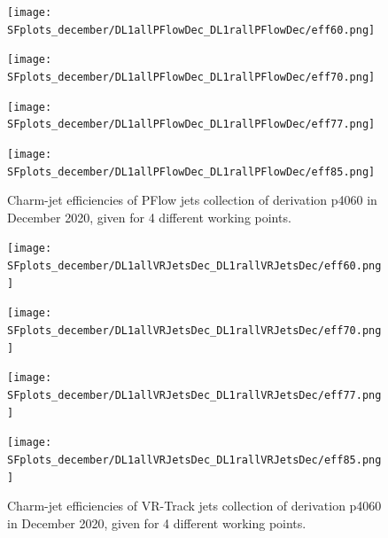 \documentclass[letterpaper,12pt]{article}
\begin{document}
\begin{figure}[H]
\begin{minipage}[b]{.45\textwidth}
\centering
\texttt{[image: SFplots\_december/DL1allPFlowDec\_DL1rallPFlowDec/eff60.png]}
\end{minipage}\hfill
\begin{minipage}[b]{.45\textwidth}
\centering
\texttt{[image: SFplots\_december/DL1allPFlowDec\_DL1rallPFlowDec/eff70.png]}
\end{minipage}\hfill
\begin{minipage}[b]{.45\textwidth}
\centering
\texttt{[image: SFplots\_december/DL1allPFlowDec\_DL1rallPFlowDec/eff77.png]}
\end{minipage}\hfill
\begin{minipage}[b]{.45\textwidth}
\centering
\texttt{[image: SFplots\_december/DL1allPFlowDec\_DL1rallPFlowDec/eff85.png]}
\end{minipage}
\caption{Charm-jet efficiencies of PFlow jets collection of derivation 
p4060 in December 2020, given for 4 different working points.} \label{fig:Dec_eff_PFlow}
\end{figure}

\begin{figure}[H]
\begin{minipage}[b]{.45\textwidth}
\centering
\texttt{[image: SFplots\_december/DL1allVRJetsDec\_DL1rallVRJetsDec/eff60.png]}
\end{minipage}\hfill
\begin{minipage}[b]{.45\textwidth}
\centering
\texttt{[image: SFplots\_december/DL1allVRJetsDec\_DL1rallVRJetsDec/eff70.png]}
\end{minipage}\hfill
\begin{minipage}[b]{.45\textwidth}
\centering
\texttt{[image: SFplots\_december/DL1allVRJetsDec\_DL1rallVRJetsDec/eff77.png]}
\end{minipage}\hfill
\begin{minipage}[b]{.45\textwidth}
\centering
\texttt{[image: SFplots\_december/DL1allVRJetsDec\_DL1rallVRJetsDec/eff85.png]}
\end{minipage}
\caption{Charm-jet efficiencies of VR-Track jets collection of derivation 
p4060 in December 2020, given for 4 different working points.} \label{fig:Dec_eff_VRJets}
\end{figure}

\end{document}
